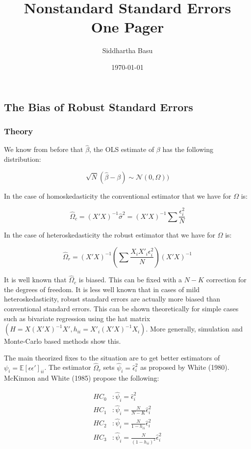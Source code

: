 \documentclass[12 pt, leqno]{article}
\begin{document}
\title{Nonstandard Standard Errors \\ One Pager}
\author{Siddhartha Basu}
\date{\today}
\maketitle

\subsection*{The Bias of Robust Standard Errors}

\subsubsection*{Theory}

We know from before that $\hat{\beta}$, the OLS estimate of $\beta$ has the following distribution:

$$\sqrt{N} (\hat{\beta} - \beta) \sim \mathcal{N}(0, \Omega)) $$

In the case of homoskedasticity the conventional estimator that we have for $\Omega$ is:

$$\hat{\Omega}_c = (X'X)^{-1} \hat{\sigma}^2 = (X'X)^{-1} \sum \frac{\epsilon_i^2}{N} $$

In the case of heteroskedasticity the robust estimator that we have for $\Omega$ is:

$$\hat{\Omega}_r = (X'X)^{-1} \left( \sum \frac{X_i X'_i \epsilon_i^2}{N} \right) (X'X)^{-1}$$

It is well known that $\hat{\Omega}_c$ is biased. This can be fixed with a $N-K$ correction for the degrees of freedom. It is less well known that in cases of mild heteroskedasticity, robust standard errors are actually more biased than conventional standard errors.  This can be shown theoretically for simple cases such as bivariate regression using the hat matrix $(H = X(X'X)^{-1} X', h_{ii} = X'_i (X'X)^{-1} X_i)$. More generally, simulation and Monte-Carlo based methods show this. 

The main theorized fixes to the situation are to get better estimators of $\psi_i = \mathbb{E}[\epsilon \epsilon']_{ii}$. The estimator $\hat{\Omega}_r$ sets $\hat{\psi}_i = \hat{\epsilon}_i^2$ as proposed by White (1980). McKinnon and White (1985) propose the following:

\begin{align*}
HC_0 &: \hat{\psi}_i = \hat{\epsilon}_i^2 \\ 
HC_1 &: \hat{\psi}_i = \frac{N}{N-K} \hat{\epsilon}_i^2 \\ 
HC_2 &: \hat{\psi}_i = \frac{N}{1 - h_{ii}} \hat{\epsilon}_i^2 \\ 
HC_3 &: \hat{\psi}_i = \frac{N}{(1 - h_{ii})^2} \hat{\epsilon}_i^2
\end{align*}
\end{document}
